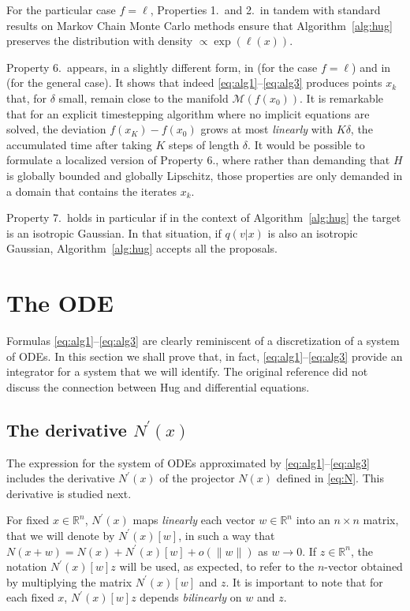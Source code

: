 \documentclass[10pt]{article}
\newcommand{\bbR}{\mathbb R}
\begin{document}
For the particular case \(f=\ell\), Properties 1.\ and 2.\ in tandem with standard results on Markov Chain Monte Carlo methods ensure that  Algorithm~\ref{alg:hug} preserves the distribution with density \(\propto \exp(\ell(x))\).

Property 6.\  appears, in a slightly different form,  in \cite{LS23} (for the case \(f=\ell\)) and  in \cite{C24} (for the general case). It shows that indeed \eqref{eq:alg1}--\eqref{eq:alg3} produces points \(x_k\) that, for \(\delta\) small, remain close to the manifold \({\mathcal M}(f(x_0))\). It is remarkable that for an explicit timestepping algorithm where no implicit equations are solved, the deviation \(f(x_K)-f(x_0)\) grows at most \emph{linearly} with \(K\delta\), the accumulated time after taking \(K\) steps of length \(\delta\).
It would be possible to formulate a localized version of Property 6.,  where rather than demanding that \(H\) is globally bounded  and globally Lipschitz, those properties are only demanded in a domain that contains the iterates \(x_k\).

Property 7.\ holds in particular if in the context of Algorithm~\ref{alg:hug} the target is an isotropic Gaussian. In that situation, if \(q(v|x)\) is also an isotropic Gaussian, Algorithm~\ref{alg:hug}  accepts all the proposals.

\section{The ODE} \label{sec:ODE}
Formulas \eqref{eq:alg1}--\eqref{eq:alg3} are clearly reminiscent of a discretization of a system of ODEs. In this section we shall prove that, in fact, \eqref{eq:alg1}--\eqref{eq:alg3} provide an integrator for a system that we will identify. The original reference \cite{LS23} did not discuss the connection between Hug and differential equations.

\subsection{The derivative \(N^\prime(x)\)} \label{subsec:differential-projector}

The expression for the system of ODEs approximated by \eqref{eq:alg1}--\eqref{eq:alg3} includes the derivative
\(N^\prime(x)\) of the projector \(N(x)\) defined in \eqref{eq:N}. This derivative is studied next.

For fixed \(x\in\bbR^n\), \(N^\prime(x)\) maps \emph{linearly} each vector \(w\in\bbR^n\) into an \(n\times n\) matrix, that we will denote by \(N^\prime(x)[w]\), in such a way that \(N(x+w) = N(x)+N^\prime(x)[w]+o(\|w\|)\) as \(w\rightarrow 0\). If \(z\in\bbR^n\), the notation \(N^\prime(x)[w]z\) will be used, as expected, to refer to the \(n\)-vector obtained by multiplying the matrix \(N^\prime(x)[w]\) and \(z\). It is important to note that for each fixed \(x\), \(N^\prime(x)[w]z\) depends \emph{bilinearly} on \(w\) and \(z\).
\end{document}

